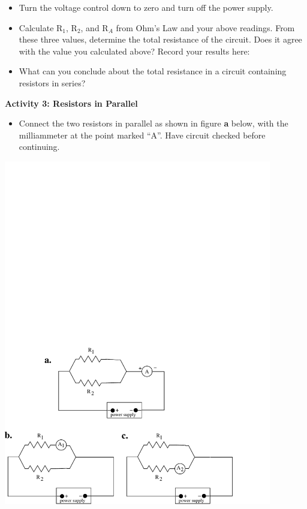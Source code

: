 \begin{itemize}
\item Turn the voltage control down to zero and turn off the power supply.

\item Calculate R\( _{1} \), R\( _{2} \), and R\( _{A} \) from Ohm's Law and 
your above readings. From these three values, determine the total resistance of 
the circuit. Does it agree with the value you calculated above? Record your 
results here:
\vspace{20mm}

\item What can you conclude about the total resistance in a circuit 
containing resistors in series?\vspace{15mm}

\end{itemize}

\pagebreak

\textbf{Activity 3: Resistors in Parallel}

\begin{itemize}
\item Connect the two resistors in parallel as shown in figure \textbf{a} 
below, with the milliammeter at the point marked ``A''. Have circuit checked 
before continuing.
\end{itemize}
\vspace{0.3cm}
\begin{center}
\includegraphics[width=4.6in]{ohms_law/ohms_law_fig_2b.pdf}
\end{center}
\vspace{0.3cm}

